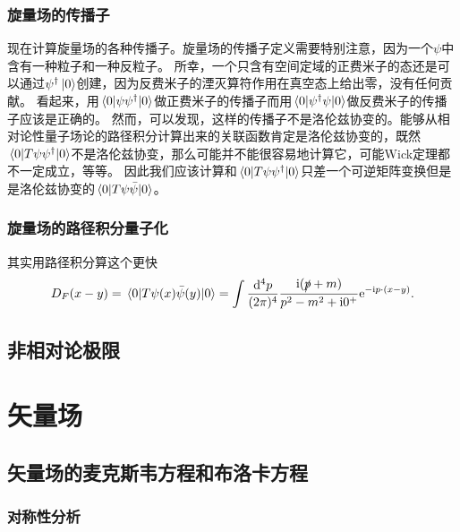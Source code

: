 \documentclass[hyperref, UTF8, a4paper]{ctexart}
\newcommand*{\ii}{\mathrm{i}}
\newcommand*{\ee}{\mathrm{e}}
\begin{document}
\subsubsection{旋量场的传播子}

现在计算旋量场的各种传播子。旋量场的传播子定义需要特别注意，因为一个$\psi$中含有一种粒子和一种反粒子。
所幸，一个只含有空间定域的正费米子的态还是可以通过$\psi^\dagger \ket{0}$创建，因为反费米子的湮灭算符作用在真空态上给出零，没有任何贡献。
看起来，用$\mel*{0}{\psi \psi^\dagger}{0}$做正费米子的传播子而用$\mel*{0}{\psi^\dagger \psi}{0}$做反费米子的传播子应该是正确的。
然而，可以发现，这样的传播子不是洛伦兹协变的。能够从相对论性量子场论的路径积分计算出来的关联函数肯定是洛伦兹协变的，既然$\mel*{0}{T \psi \psi^\dagger}{0}$不是洛伦兹协变，那么可能并不能很容易地计算它，可能Wick定理都不一定成立，等等。
因此我们应该计算和$\mel*{0}{T \psi \psi^\dagger}{0}$只差一个可逆矩阵变换但是是洛伦兹协变的$\mel*{0}{T \psi \bar{\psi}}{0}$。

\subsubsection{旋量场的路径积分量子化}

其实用路径积分算这个更快
\begin{equation}
    D_F(x-y) = \mel{0}{T \psi(x) \bar{\psi}(y)}{0} = \int \frac{\dd[4]{p}}{(2\pi)^4} \frac{\ii (\slashed{p} + m)}{p^2 - m^2 + \ii 0^+} \ee^{- \ii p \cdot (x- y)}.
\end{equation}

\subsection{非相对论极限}

\section{矢量场}


\subsection{矢量场的麦克斯韦方程和布洛卡方程}

\subsubsection{对称性分析}
\end{document}
